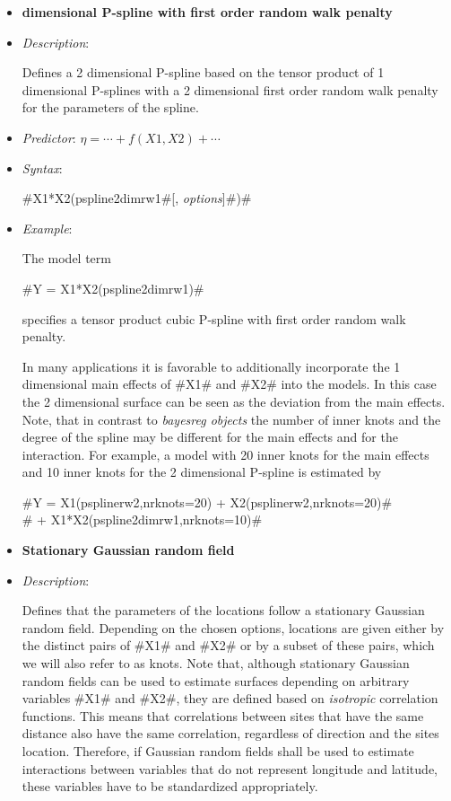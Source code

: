 \begin{itemize}
\item[]{\bf{} dimensional P-spline with first order
random walk penalty}

\item[] {\em Description}:

Defines a 2 dimensional P-spline based on the tensor product of 1
dimensional P-splines with a 2 dimensional first order random walk
penalty for the parameters of the spline.
\item[] {\em Predictor}: $\eta= \cdots + f(X1,X2) + \cdots$
\item[] {\em Syntax}:

#X1*X2(pspline2dimrw1#[, {\em options}]#)#
\item[] {\em Example}:

The model term

#Y = X1*X2(pspline2dimrw1)#

specifies a tensor product cubic P-spline with first order random
walk penalty.

In many applications it is favorable to additionally incorporate the
1 dimensional main effects of #X1# and #X2# into the models. In this
case the 2 dimensional surface can be seen as the deviation from the
main effects. Note, that in contrast to {\em bayesreg objects} the
number of inner knots and the degree of the spline may be different
for the main effects and for the interaction. For example, a model
with 20 inner knots for the main effects and 10 inner knots for the
2 dimensional P-spline is estimated by

 #Y = X1(psplinerw2,nrknots=20) + X2(psplinerw2,nrknots=20)#\\
 #    + X1*X2(pspline2dimrw1,nrknots=10)#

\item[]{\bf\sffamily Stationary Gaussian random field}

\item[] {\em Description}:

Defines that the parameters of the locations follow a stationary
Gaussian random field. Depending on the chosen options, locations
are given either by the distinct pairs of #X1# and #X2# or by a
subset of these pairs, which we will also refer to as knots. Note
that, although stationary Gaussian random fields can be used to
estimate surfaces depending on arbitrary variables #X1# and #X2#,
they are defined based on {\em isotropic} correlation functions.
This means that correlations between sites that have the same
distance also have the same correlation, regardless of direction
and the sites location. Therefore, if Gaussian random fields shall
be used to estimate interactions between variables that do not
represent longitude and latitude, these variables have to be
standardized appropriately.


\end{itemize}
